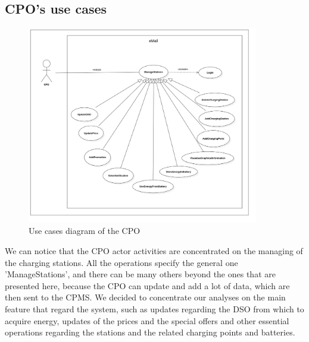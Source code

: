 \subsection{CPO's use cases}
\begin{figure}[H]
    \centering
    \includegraphics[width= 0.9\textwidth, trim={1cm 2cm 2cm 1cm}, clip]{Images/cp3/UseCaseDiagramCPO.png}
    \caption{Use cases diagram of the CPO}
\end{figure}
We can notice that the CPO actor activities are concentrated on the managing of the charging stations. All the operations specify the general one 'ManageStations', and there can be many others beyond the ones that are presented here, because the CPO can update and add a lot of data, which are then sent to the CPMS. We decided to concentrate our analyses on the main feature that regard the system, such as updates regarding the DSO from which to acquire energy, updates of the prices and the special offers and other essential operations regarding the stations and the related charging points and batteries.

\clearpage
